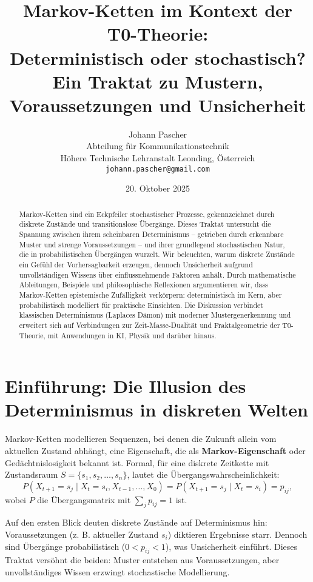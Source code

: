\documentclass[12pt,a4paper]{article}
\title{Markov-Ketten im Kontext der T0-Theorie:\\Deterministisch oder stochastisch?\\Ein Traktat zu Mustern, Voraussetzungen und Unsicherheit}
\author{Johann Pascher\\
	Abteilung für Kommunikationstechnik\\
	Höhere Technische Lehranstalt Leonding, Österreich\\
	\texttt{johann.pascher@gmail.com}}
\date{20. Oktober 2025}
\begin{document}
	
	\maketitle
	
	\begin{abstract}
		Markov-Ketten sind ein Eckpfeiler stochastischer Prozesse, gekennzeichnet durch diskrete Zustände und transitionslose Übergänge. Dieses Traktat untersucht die Spannung zwischen ihrem scheinbaren Determinismus – getrieben durch erkennbare Muster und strenge Voraussetzungen – und ihrer grundlegend stochastischen Natur, die in probabilistischen Übergängen wurzelt. Wir beleuchten, warum diskrete Zustände ein Gefühl der Vorhersagbarkeit erzeugen, dennoch Unsicherheit aufgrund unvollständigen Wissens über einflussnehmende Faktoren anhält. Durch mathematische Ableitungen, Beispiele und philosophische Reflexionen argumentieren wir, dass Markov-Ketten epistemische Zufälligkeit verkörpern: deterministisch im Kern, aber probabilistisch modelliert für praktische Einsichten. Die Diskussion verbindet klassischen Determinismus (Laplaces Dämon) mit moderner Mustergenerkennung und erweitert sich auf Verbindungen zur Zeit-Masse-Dualität und Fraktalgeometrie der T0-Theorie, mit Anwendungen in KI, Physik und darüber hinaus.
	\end{abstract}
	
	\tableofcontents
	
	\section{Einführung: Die Illusion des Determinismus in diskreten Welten}
	\label{sec:intro}
	
	Markov-Ketten modellieren Sequenzen, bei denen die Zukunft allein vom aktuellen Zustand abhängt, eine Eigenschaft, die als \textbf{Markov-Eigenschaft} oder Gedächtnislosigkeit bekannt ist. Formal, für eine diskrete Zeitkette mit Zustandsraum $S = \{s_1, s_2, \dots, s_n\}$, lautet die Übergangswahrscheinlichkeit:
	\begin{equation}
		P(X_{t+1} = s_j \mid X_t = s_i, X_{t-1}, \dots, X_0) = P(X_{t+1} = s_j \mid X_t = s_i) = p_{ij},
	\end{equation}
	wobei $P$ die Übergangsmatrix mit $\sum_j p_{ij} = 1$ ist.
	
	Auf den ersten Blick deuten diskrete Zustände auf Determinismus hin: Voraussetzungen (z. B. aktueller Zustand $s_i$) diktieren Ergebnisse starr. Dennoch sind Übergänge probabilistisch ($0 < p_{ij} < 1$), was Unsicherheit einführt. Dieses Traktat versöhnt die beiden: Muster entstehen aus Voraussetzungen, aber unvollständiges Wissen erzwingt stochastische Modellierung.
	
\end{document}

